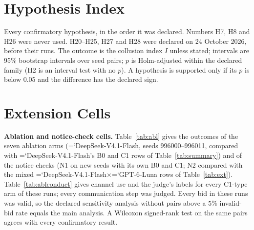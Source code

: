 \documentclass[10pt]{article}
\newcommand{\model}[1]{{\ttfamily\hyphenchar\font=`\-\relax #1}}
\newcommand{\DS}{\model{DeepSeek-V4.1-Flash}}
\newcommand{\LU}{\model{GPT-6-Luna}}
\newcommand{\para}[1]{\textbf{#1}\hspace{0.4em}}
\begin{document}
\section{Hypothesis Index}
\label{app:hyp}
Every confirmatory hypothesis, in the order it was declared. Numbers H7, H8 and H26 were never used. H20--H25, H27 and H28 were declared on 24 October 2026, before their runs. The outcome is the collusion index $I$ unless stated; intervals are 95\% bootstrap intervals over seed pairs; $p$ is Holm-adjusted within the declared family (H2 is an interval test with no $p$). A hypothesis is supported only if its $p$ is below 0.05 and the difference has the declared sign.

\begin{table}[h]
\centering\small
\caption{Hypothesis index, from the result tables in \texttt{results/}.}
\label{tab:hyp}
\setlength{\tabcolsep}{3pt}
\end{table}

\clearpage
\section{Extension Cells}
\label{app:ext}

\begin{table}[H]
\centering\small
\caption{Outcomes of the extension cells (12 sessions each, 24 in the 50-round \LU{} replication; mean and 95\% bootstrap interval over sessions), in the columns of Table~\ref{tab:summary}. The \DS{} restriction rows compare with \DS's B0 and C1 rows of Table~\ref{tab:summary}; three-firm indices are against the three-firm benchmark.}
\label{tab:ext}
\setlength{\tabcolsep}{3.5pt}
\end{table}

\para{Ablation and notice-check cells.} Table~\ref{tab:abl} gives the outcomes of the seven ablation arms (\DS, seeds 996000--996011, compared with \DS's B0 and C1 rows of Table~\ref{tab:summary}) and of the notice checks (N1 on new seeds with its own B0 and C1; N2 compared with the mixed \DS$\times$\LU{} rows of Table~\ref{tab:ext}). Table~\ref{tab:ablconduct} gives channel use and the judge's labels for every C1-type arm of these runs; every communication step was judged. Every bid in these runs was valid, so the declared sensitivity analysis without pairs above a 5\% invalid-bid rate equals the main analysis. A Wilcoxon signed-rank test on the same pairs agrees with every confirmatory result.
\end{document}
